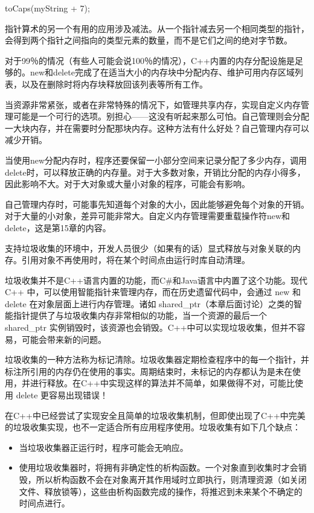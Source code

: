 \begin{cpp}
toCaps(myString + 7);
\end{cpp}

指针算术的另一个有用的应用涉及减法。从一个指针减去另一个相同类型的指针，会得到两个指针之间指向的类型元素的数量，而不是它们之间的绝对字节数。


对于99％的情况（有些人可能会说100％的情况），C++内置的内存分配设施是足够的。new和delete完成了在适当大小的内存块中分配内存、维护可用内存区域列表，以及在删除时将内存块释放回该列表等所有工作。

当资源非常紧张，或者在非常特殊的情况下，如管理共享内存，实现自定义内存管理可能是一个可行的选项。别担心——这没有听起来那么可怕。自己管理则会分配一大块内存，并在需要时分配那块内存。这种方法有什么好处？自己管理内存可以减少开销。

当使用new分配内存时，程序还要保留一小部分空间来记录分配了多少内存，调用delete时，可以释放正确的内存量。对于大多数对象，开销比分配的内存小得多，因此影响不大。对于大对象或大量小对象的程序，可能会有影响。

自己管理内存时，可能事先知道每个对象的大小，因此能够避免每个对象的开销。对于大量的小对象，差异可能非常大。自定义内存管理需要重载操作符new和delete，这是第15章的内容。


支持垃圾收集的环境中，开发人员很少（如果有的话）显式释放与对象关联的内存。引用对象不再使用时，将在某个时间点由运行时库自动清理。

垃圾收集并不是C++语言内置的功能，而C\#和Java语言中内置了这个功能。现代C++ 中，可以使用智能指针来管理内存，而在历史遗留代码中，会通过 new 和 delete 在对象层面上进行内存管理。诸如 shared\_ptr（本章后面讨论）之类的智能指针提供了与垃圾收集内存非常相似的功能，当一个资源的最后一个 shared\_ptr 实例销毁时，该资源也会销毁。C++中可以实现垃圾收集，但并不容易，可能会带来新的问题。

垃圾收集的一种方法称为标记清除。垃圾收集器定期检查程序中的每一个指针，并标注所引用的内存仍在使用的事实。周期结束时，未标记的内存都认为是未在使用，并进行释放。在C++中实现这样的算法并不简单，如果做得不对，可能比使用 delete 更容易出现错误！

在C++中已经尝试了实现安全且简单的垃圾收集机制，但即使出现了C++中完美的垃圾收集实现，也不一定适合所有应用程序使用。垃圾收集有如下几个缺点：

\begin{itemize}
\item
当垃圾收集器正运行时，程序可能会无响应。

\item
使用垃圾收集器时，将拥有非确定性的析构函数。一个对象直到收集时才会销毁，所以析构函数不会在对象离开其作用域时立即执行，则清理资源（如关闭文件、释放锁等），这些由析构函数完成的操作，将推迟到未来某个不确定的时间点进行。
\end{itemize}

